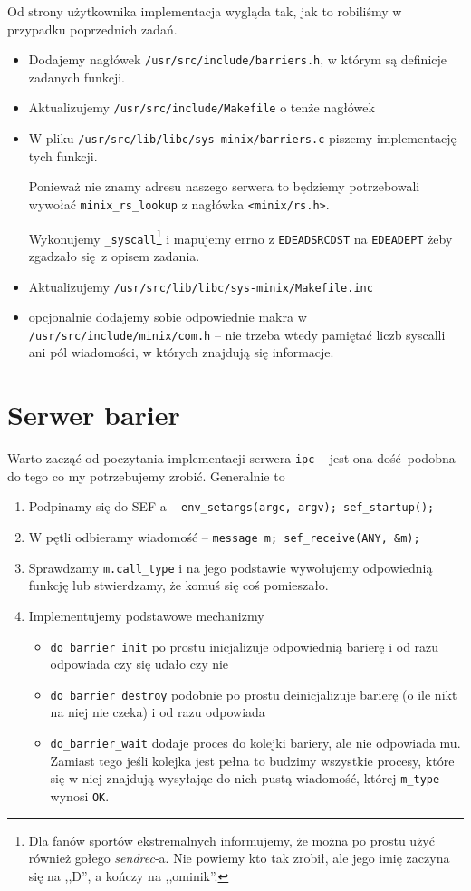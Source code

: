Od strony użytkownika implementacja wygląda tak, jak to robiliśmy w przypadku poprzednich zadań.
\begin{itemize}
	\item Dodajemy nagłówek \texttt{/usr/src/include/barriers.h}, w którym są definicje zadanych funkcji.
	\item Aktualizujemy \texttt{/usr/src/include/Makefile} o tenże nagłówek
	\item W pliku \texttt{/usr/src/lib/libc/sys-minix/barriers.c} piszemy implementację tych funkcji.

	      Ponieważ nie znamy adresu naszego serwera to będziemy potrzebowali wywołać \texttt{minix\_rs\_lookup} z nagłówka \texttt{<minix/rs.h>}.

	      Wykonujemy \texttt{\_syscall}\footnote{Dla fanów sportów ekstremalnych informujemy, że można po prostu użyć również gołego \textit{sendrec}-a. Nie powiemy kto tak zrobił, ale jego imię zaczyna się na ,,D'', a kończy na ,,ominik''. } i mapujemy errno z \texttt{EDEADSRCDST} na \texttt{EDEADEPT} żeby zgadzało się z opisem zadania.
	\item Aktualizujemy \texttt{/usr/src/lib/libc/sys-minix/Makefile.inc}
	\item opcjonalnie dodajemy sobie odpowiednie makra w \texttt{/usr/src/include/minix/com.h} -- nie trzeba wtedy pamiętać liczb syscalli ani pól wiadomości, w których znajdują się informacje.
\end{itemize}

\section{Serwer barier}
Warto zacząć od poczytania implementacji serwera \texttt{ipc} -- jest ona dość podobna do tego co my potrzebujemy zrobić. Generalnie to
\begin{enumerate}
	\item Podpinamy się do SEF-a -- \texttt{env\_setargs(argc, argv); sef\_startup();}
	\item W pętli odbieramy wiadomość -- \texttt{message m; sef\_receive(ANY, \&m);}
	\item Sprawdzamy \texttt{m.call\_type} i na jego podstawie wywołujemy odpowiednią funkcję lub stwierdzamy, że komuś się coś pomieszało.
	\item Implementujemy podstawowe mechanizmy
	      \begin{itemize}
		      \item \texttt{do\_barrier\_init} po prostu inicjalizuje odpowiednią barierę i od razu odpowiada czy się udało czy nie
		      \item \texttt{do\_barrier\_destroy} podobnie po prostu deinicjalizuje barierę (o ile nikt na niej nie czeka) i od razu odpowiada
		      \item \texttt{do\_barrier\_wait} dodaje proces do kolejki bariery, ale nie odpowiada mu.
		            Zamiast tego jeśli kolejka jest pełna to budzimy wszystkie procesy, które się w niej znajdują wysyłając do nich pustą wiadomość, której \texttt{m\_type} wynosi \texttt{OK}.
	      \end{itemize}

\end{enumerate}

